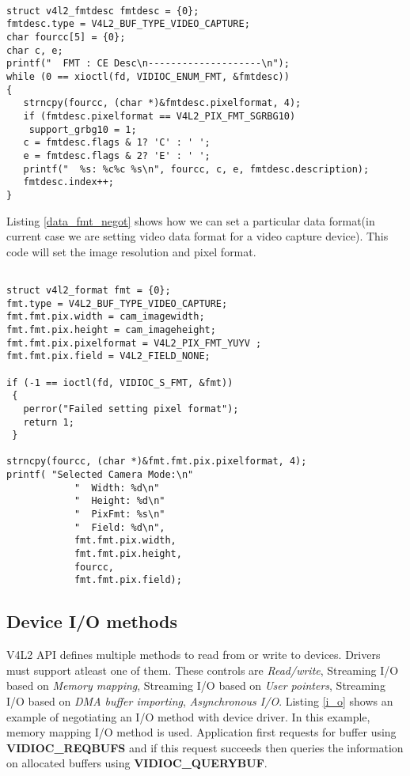 \documentclass{article}
\begin{document}
\begin{lstlisting}[label=data_fmt_enumerate,caption=Data format enumeration and negotiation]

struct v4l2_fmtdesc fmtdesc = {0};
fmtdesc.type = V4L2_BUF_TYPE_VIDEO_CAPTURE;
char fourcc[5] = {0};
char c, e;
printf("  FMT : CE Desc\n--------------------\n");
while (0 == xioctl(fd, VIDIOC_ENUM_FMT, &fmtdesc))
{
   strncpy(fourcc, (char *)&fmtdesc.pixelformat, 4);
   if (fmtdesc.pixelformat == V4L2_PIX_FMT_SGRBG10)
    support_grbg10 = 1;
   c = fmtdesc.flags & 1? 'C' : ' ';
   e = fmtdesc.flags & 2? 'E' : ' ';
   printf("  %s: %c%c %s\n", fourcc, c, e, fmtdesc.description);
   fmtdesc.index++;
}
\end{lstlisting}

Listing \ref{data_fmt_negot} shows how we can set a particular data format(in current case we are setting video data format for a video capture device). This code will set the image resolution and pixel format. 

\begin{lstlisting}[label=data_fmt_negot,caption=Data format negotiation]

struct v4l2_format fmt = {0};
fmt.type = V4L2_BUF_TYPE_VIDEO_CAPTURE;
fmt.fmt.pix.width = cam_imagewidth;
fmt.fmt.pix.height = cam_imageheight;
fmt.fmt.pix.pixelformat = V4L2_PIX_FMT_YUYV ;
fmt.fmt.pix.field = V4L2_FIELD_NONE;

if (-1 == ioctl(fd, VIDIOC_S_FMT, &fmt))
 {
   perror("Failed setting pixel format");
   return 1;
 }

strncpy(fourcc, (char *)&fmt.fmt.pix.pixelformat, 4);
printf( "Selected Camera Mode:\n"
            "  Width: %d\n"
            "  Height: %d\n"
            "  PixFmt: %s\n"
            "  Field: %d\n",
            fmt.fmt.pix.width,
            fmt.fmt.pix.height,
            fourcc,
            fmt.fmt.pix.field);

\end{lstlisting}


\subsection{Device I/O methods}
V4L2 API defines multiple methods to read from or write to devices. Drivers must support atleast one of them. These controls are \textit{Read/write}, Streaming I/O based on \textit{Memory mapping}, Streaming I/O based on \textit{User pointers}, Streaming I/O based on \textit{DMA buffer importing}, \textit{Asynchronous I/O}. Listing \ref{i_o} shows an example of negotiating an I/O method with device driver. In this example, memory mapping I/O method is used. Application first requests for buffer using \textbf{VIDIOC\_REQBUFS} and if this request succeeds then queries the information on allocated buffers using \textbf{VIDIOC\_QUERYBUF}.
\end{document}
